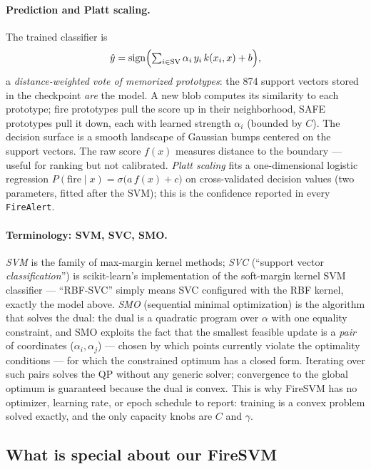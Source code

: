 \documentclass[11pt]{article}
\newcommand{\code}[1]{\texttt{\small #1}}
\begin{document}
\paragraph{Prediction and Platt scaling.}
The trained classifier is
\[
\hat y=\operatorname{sign}\Bigl(\textstyle\sum_{i\in\mathrm{SV}}
\alpha_i\,y_i\,k(x_i,x)+b\Bigr),
\]
a \emph{distance-weighted vote of memorized prototypes}: the 874 support
vectors stored in the checkpoint \emph{are} the model. A new blob computes
its similarity to each prototype; fire prototypes pull the score up in
their neighborhood, SAFE prototypes pull it down, each with learned
strength $\alpha_i$ (bounded by $C$). The decision surface is a smooth
landscape of Gaussian bumps centered on the support vectors. The raw score
$f(x)$ measures distance to the boundary --- useful for ranking but not
calibrated. \emph{Platt scaling} fits a one-dimensional logistic
regression $P(\text{fire}\mid x)=\sigma\bigl(a\,f(x)+c\bigr)$ on
cross-validated decision values (two parameters, fitted after the SVM);
this is the confidence reported in every \code{FireAlert}.

\paragraph{Terminology: SVM, SVC, SMO.}
\emph{SVM} is the family of max-margin kernel methods; \emph{SVC}
(``support vector \emph{classification}'') is scikit-learn's implementation
of the soft-margin kernel SVM classifier --- ``RBF-SVC'' simply means SVC
configured with the RBF kernel, exactly the model above. \emph{SMO}
(sequential minimal optimization) is the algorithm that solves the dual:
the dual is a quadratic program over $\alpha$ with one equality constraint,
and SMO exploits the fact that the smallest feasible update is a
\emph{pair} of coordinates ($\alpha_i,\alpha_j$) --- chosen by which points
currently violate the optimality conditions --- for which the constrained
optimum has a closed form. Iterating over such pairs solves the QP without
any generic solver; convergence to the global optimum is guaranteed
because the dual is convex. This is why FireSVM has no optimizer, learning
rate, or epoch schedule to report: training is a convex problem solved
exactly, and the only capacity knobs are $C$ and $\gamma$.

\subsection{What is special about our FireSVM}
\end{document}
